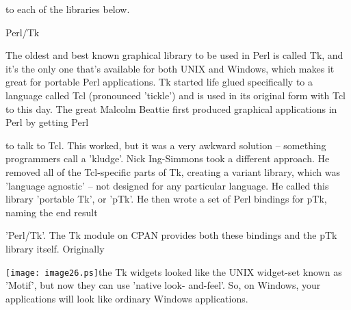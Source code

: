 \documentclass[a4paper,11pt]{book}
\begin{document}
\noindent to each of the libraries below.

\noindent 

\noindent 

\noindent Perl/Tk

\noindent 

\noindent The oldest and best known graphical library to be used in Perl is called Tk, and it's the only one that's available for both UNIX and Windows, which makes it great for portable Perl applications. Tk started life glued specifically to a language called Tcl (pronounced 'tickle') and is used in its original form with Tcl to this day. The great Malcolm Beattie first produced graphical applications in Perl by getting Perl

\noindent to talk to Tcl. This worked, but it was a very awkward solution -- something programmers call a 'kludge'. Nick Ing-Simmons took a different approach. He removed all of the Tcl-specific parts of Tk, creating a variant library, which was 'language agnostic' -- not designed for any particular language. He called this library 'portable Tk', or 'pTk'. He then wrote a set of Perl bindings for pTk, naming the end result

\noindent 'Perl/Tk'. The Tk module on CPAN provides both these bindings and the pTk library itself. Originally

\noindent \texttt{[image: image26.ps]}the Tk widgets looked like the UNIX widget-set known as 'Motif', but now they can use 'native look- and-feel'. So, on Windows, your applications will look like ordinary Windows applications.

\noindent 

\noindent 

\noindent 

\noindent 

\noindent 

\noindent 

\noindent 

\noindent 

\noindent 

\noindent 

\noindent 

\noindent 

\noindent 

\noindent 

\noindent 

\noindent 

\noindent 
\end{document}
